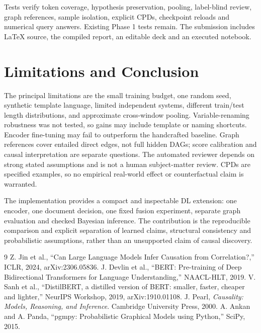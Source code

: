 \documentclass[conference]{IEEEtran}
\begin{document}
Tests verify token coverage, hypothesis preservation, pooling, label-blind review, graph references, sample isolation, explicit CPDs, checkpoint reloads and numerical query answers. Existing Phase 1 tests remain. The submission includes LaTeX source, the compiled report, an editable deck and an executed notebook.

\section{Limitations and Conclusion}
The principal limitations are the small training budget, one random seed, synthetic template language, limited independent systems, different train/test length distributions, and approximate cross-window pooling. Variable-renaming robustness was not tested, so gains may include template or naming shortcuts. Encoder fine-tuning may fail to outperform the handcrafted baseline. Graph references cover entailed direct edges, not full hidden DAGs; score calibration and causal interpretation are separate questions. The automated reviewer depends on strong stated assumptions and is not a human subject-matter review. CPDs are specified examples, so no empirical real-world effect or counterfactual claim is warranted.

The implementation provides a compact and inspectable DL extension: one encoder, one document decision, one fixed fusion experiment, separate graph evaluation and checked Bayesian inference. The contribution is the reproducible comparison and explicit separation of learned claims, structural consistency and probabilistic assumptions, rather than an unsupported claim of causal discovery.

\begin{thebibliography}{9}
 Z. Jin et al., ``Can Large Language Models Infer Causation from Correlation?,'' ICLR, 2024, arXiv:2306.05836.
 J. Devlin et al., ``BERT: Pre-training of Deep Bidirectional Transformers for Language Understanding,'' NAACL-HLT, 2019.
 V. Sanh et al., ``DistilBERT, a distilled version of BERT: smaller, faster, cheaper and lighter,'' NeurIPS Workshop, 2019, arXiv:1910.01108.
 J. Pearl, \emph{Causality: Models, Reasoning, and Inference}. Cambridge University Press, 2000.
 A. Ankan and A. Panda, ``pgmpy: Probabilistic Graphical Models using Python,'' SciPy, 2015.
\end{thebibliography}
\end{document}
